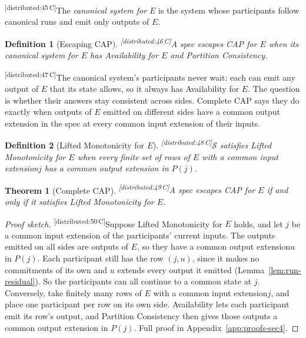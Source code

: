\documentclass[sigconf]{cidr-2027}
\newtheorem{theorem}{Theorem}
\newtheorem{definition}{Definition}
\theoremstyle{remark}
\newcommand{\commitments}{commitments\xspace}
\newcommand{\indesc}{input extension\xspace} %
\newcommand{\outrel}{extends\xspace}          %
\newcommand{\outnoun}{output extension\xspace}%
\newcommand{\Spec}{\mathcal{S}}
\newcommand{\fiber}[1]{P(#1)}
\newcommand{\cxtag}[2]{\textsuperscript{\textsf{\tiny[#1\,#2]}}}
\begin{document}
\color{black!45}\cxtag{distributed:45}{C}The \emph{canonical system for $E$} is the system whose participants follow
canonical runs and emit only outputs of $E$.\color{black}

\color{black!45}\begin{definition}[Escaping CAP]
\label{def:escapes-cap}
\cxtag{distributed:46}{C}A spec \emph{escapes CAP} for $E$ when its canonical system for $E$ has
Availability for $E$ and Partition Consistency.\color{black}
\end{definition}

\color{black!45}\cxtag{distributed:47}{C}The canonical system's participants never wait: each can emit any output of
$E$ that its state allows, so it always has Availability for $E$.  The
question is whether their answers stay consistent across sides.  Complete CAP
says they do exactly when outputs of $E$ emitted on different sides have a
common \outnoun in the spec at every common \indesc of their inputs.\color{black}

\color{black!45}\begin{definition}[Lifted Monotonicity for $E$]
\label{def:lm-for-A}
\cxtag{distributed:48}{C}$\Spec$ satisfies \emph{Lifted Monotonicity for $E$} when every finite set of rows of $E$ with
a common \indesc $j$ has a common \outnoun in $\fiber{j}$.\color{black}
\end{definition}

\color{black!45}\begin{theorem}[Complete CAP]
\label{thm:complete-cap}
\cxtag{distributed:49}{C}A spec escapes CAP for $E$ if and only if it satisfies Lifted Monotonicity for
$E$.\color{black}
\end{theorem}

\color{black!45}\begin{proof}[Proof sketch]
\cxtag{distributed:50}{C}Suppose Lifted Monotonicity for $E$ holds, and let $j$ be a common \indesc of
the participants' current inputs.  The outputs emitted on all sides are outputs
of $E$, so they have a common \outnoun $u$ in $\fiber{j}$.  Each participant
still has the row $(j,u)$, since it makes no \commitments of its own and $u$
\outrel every output it emitted (Lemma~\ref{lem:run-residual}).  So the
participants can all continue to a common state at $j$.  Conversely, take
finitely many rows of $E$ with a common \indesc $j$, and place one participant
per row on its own side.  Availability lets each participant emit its row's
output, and Partition Consistency then gives those outputs a common \outnoun in
$\fiber{j}$.  Full proof in
Appendix~\ref{app:proofs-sec4}.\color{black}
\end{proof}
\end{document}

